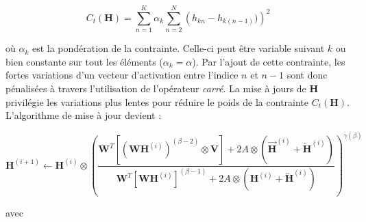 \begin{equation}\label{eq:smoothnessVirtanen}
C_t(\mathbf{H}) = \sum_{n=1}^K \alpha_k\sum_{n=2}^N \left(h_{kn} - h_{k(n-1)})\right)^2
\end{equation}

où $\alpha_k$ est la pondération de la contrainte. Celle-ci peut être variable suivant $k$ ou bien constante sur tout les éléments ($\alpha_k = \alpha$). Par l'ajout de cette contrainte, les fortes variations d'un vecteur d'activation entre l'indice $n$ et $n-1$ sont donc pénalisées à travers l'utilisation de l'opérateur \textit{carré}. La mise à jours de $\mathbf{H}$ privilégie les variations plus lentes pour réduire le poids de la contrainte $C_t(\mathbf{H})$. L'algorithme de mise à jour devient :

\begin{equation}
\textbf{H}^{(i+1)} \leftarrow \textbf{H}^{(i)} \otimes\left(\frac{\textbf{W}^T \left[\left(\textbf{WH}^{(i)} \right)^{(\beta-2)} \otimes \textbf{V} \right] + 2 A \otimes \left(\overrightarrow{\mathbf{H}}^{(i)} + \overleftarrow{\mathbf{H}}^{(i)} \right)}{\textbf{W}^T \left[\textbf{WH}^{(i)} \right]^{(\beta-1)} + 2 A \otimes \left(\mathbf{H}^{(i)} + \overleftrightarrow{\mathbf{H}}^{(i)} \right)}\right)^{\gamma(\beta)}\label{eq:HupdateSmooth}
\end{equation}

avec 

